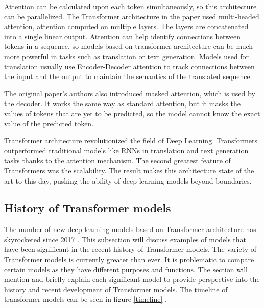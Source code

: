 Attention can be calculated upon each token simultaneously, so this architecture can be parallelized. The Transformer architecture in the paper used multi-headed attention, attention computed on multiple layers. The layers are concatenated into a single linear output. Attention can help identify connections between tokens in a sequence, so models based on transformer architecture can be much more powerful in tasks such as translation or text generation. Models used for translation usually use Encoder-Decoder attention to track connections between the input and the output to maintain the semantics of the translated sequence.

The original paper's authors also introduced masked attention, which is used by the decoder. It works the same way as standard attention, but it masks the values of tokens that are yet to be predicted, so the model cannot know the exact value of the predicted token.


Transformer architecture revolutionized the field of Deep Learning. Transformers outperformed traditional models like RNNs in translation and text generation tasks thanks to the attention mechanism. The second greatest feature of Transformers was the scalability. The result makes this architecture state of the art to this day, pushing the ability of deep learning models beyond boundaries.
\cite{attention}


\subsection{History of Transformer models}

The number of new deep-learning models based on Transformer architecture has skyrocketed since 2017 \cite{amatriain2023transformer}. This subsection will discuss examples of models that have been significant in the recent history of Transformer models. The variety of Transformer models is currently greater than ever. It is problematic to compare certain models as they have different purposes and functions. The section will mention and briefly explain each significant model to provide perspective into the history and recent development of Transformer models. The timeline of transformer models can be seen in figure \ref{timeline} \cite{amatriain2023transformer}.

